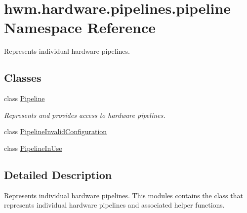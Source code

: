 \hypertarget{namespacehwm_1_1hardware_1_1pipelines_1_1pipeline}{\section{hwm.\-hardware.\-pipelines.\-pipeline Namespace Reference}
\label{namespacehwm_1_1hardware_1_1pipelines_1_1pipeline}
}


Represents individual hardware pipelines.  


\subsection*{Classes}
\begin{DoxyCompactItemize}
\item 
class \hyperlink{classhwm_1_1hardware_1_1pipelines_1_1pipeline_1_1_pipeline}{Pipeline}
\begin{DoxyCompactList}\small\item\em Represents and provides access to hardware pipelines. \end{DoxyCompactList}\item 
class \hyperlink{classhwm_1_1hardware_1_1pipelines_1_1pipeline_1_1_pipeline_invalid_configuration}{Pipeline\-Invalid\-Configuration}
\item 
class \hyperlink{classhwm_1_1hardware_1_1pipelines_1_1pipeline_1_1_pipeline_in_use}{Pipeline\-In\-Use}
\end{DoxyCompactItemize}


\subsection{Detailed Description}
Represents individual hardware pipelines. This modules contains the class that represents individual hardware pipelines and associated helper functions. 